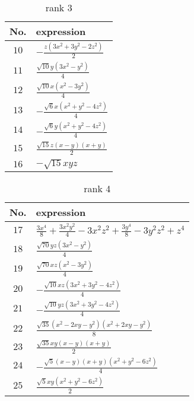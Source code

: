 \documentclass[fleqn,8pt,landscape]{jsarticle}
\begin{document}
\begin{table}[ht!]
\begin{center}
\caption{rank 3}
\renewcommand{\arraystretch}{1.3}
\begin{tabular}{cl} \hline \hline
No. & expression \\ \hline
$ 10 $ & $ - \frac{z \left(3 x^{2} + 3 y^{2} - 2 z^{2}\right)}{2} $ \\
$ 11 $ & $ \frac{\sqrt{10} y \left(3 x^{2} - y^{2}\right)}{4} $ \\
$ 12 $ & $ \frac{\sqrt{10} x \left(x^{2} - 3 y^{2}\right)}{4} $ \\
$ 13 $ & $ - \frac{\sqrt{6} x \left(x^{2} + y^{2} - 4 z^{2}\right)}{4} $ \\
$ 14 $ & $ - \frac{\sqrt{6} y \left(x^{2} + y^{2} - 4 z^{2}\right)}{4} $ \\
$ 15 $ & $ \frac{\sqrt{15} z \left(x - y\right) \left(x + y\right)}{2} $ \\
$ 16 $ & $ - \sqrt{15} x y z $ \\
 \hline \hline
\end{tabular}
\end{center}
\end{table}
\begin{table}[ht!]
\begin{center}
\caption{rank 4}
\renewcommand{\arraystretch}{1.3}
\begin{tabular}{cl} \hline \hline
No. & expression \\ \hline
$ 17 $ & $ \frac{3 x^{4}}{8} + \frac{3 x^{2} y^{2}}{4} - 3 x^{2} z^{2} + \frac{3 y^{4}}{8} - 3 y^{2} z^{2} + z^{4} $ \\
$ 18 $ & $ \frac{\sqrt{70} y z \left(3 x^{2} - y^{2}\right)}{4} $ \\
$ 19 $ & $ \frac{\sqrt{70} x z \left(x^{2} - 3 y^{2}\right)}{4} $ \\
$ 20 $ & $ - \frac{\sqrt{10} x z \left(3 x^{2} + 3 y^{2} - 4 z^{2}\right)}{4} $ \\
$ 21 $ & $ - \frac{\sqrt{10} y z \left(3 x^{2} + 3 y^{2} - 4 z^{2}\right)}{4} $ \\
$ 22 $ & $ \frac{\sqrt{35} \left(x^{2} - 2 x y - y^{2}\right) \left(x^{2} + 2 x y - y^{2}\right)}{8} $ \\
$ 23 $ & $ \frac{\sqrt{35} x y \left(x - y\right) \left(x + y\right)}{2} $ \\
$ 24 $ & $ - \frac{\sqrt{5} \left(x - y\right) \left(x + y\right) \left(x^{2} + y^{2} - 6 z^{2}\right)}{4} $ \\
$ 25 $ & $ \frac{\sqrt{5} x y \left(x^{2} + y^{2} - 6 z^{2}\right)}{2} $ \\
 \hline \hline
\end{tabular}
\end{center}
\end{table}
\end{document}
